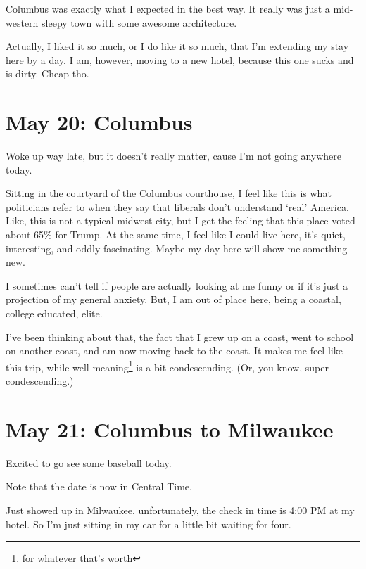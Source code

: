\documentclass[../butidigress.tex]{subfiles}
\begin{document}
\entryskip

Columbus was exactly what I expected in the best way.
It really was just a mid-western sleepy town with some awesome architecture.

Actually, I liked it so much, or I do like it so much, that I'm extending my stay here by a day.
I am, however, moving to a new hotel, because this one sucks and is dirty.
Cheap tho.

\section{May 20: Columbus}
Woke up way late, but it doesn't really matter, cause I'm not going anywhere today.

\entryskip

Sitting in the courtyard of the Columbus courthouse, I feel like this is what politicians refer to when they say that liberals don't understand `real' America.
Like, this is not a typical midwest city, but I get the feeling that this place voted about 65\% for Trump.
At the same time, I feel like I could live here, it's quiet, interesting, and oddly fascinating.
Maybe my day here will show me something new.

I sometimes can't tell if people are actually looking at me funny or if it's just a projection of my general anxiety.
But, I am out of place here, being a coastal, college educated, elite.

I've been thinking about that, the fact that I grew up on a coast, went to school on another coast, and am now moving back to the coast.
It makes me feel like this trip, while well meaning\footnote{for whatever that's worth} is a bit condescending.
(Or, you know, super condescending.)

\section{May 21: Columbus to Milwaukee}
Excited to go see some baseball today.

\entryskip

Note that the date is now in Central Time.

Just showed up in Milwaukee, unfortunately, the check in time is 4:00 PM at my hotel.
So I'm just sitting in my car for a little bit waiting for four.
\end{document}
